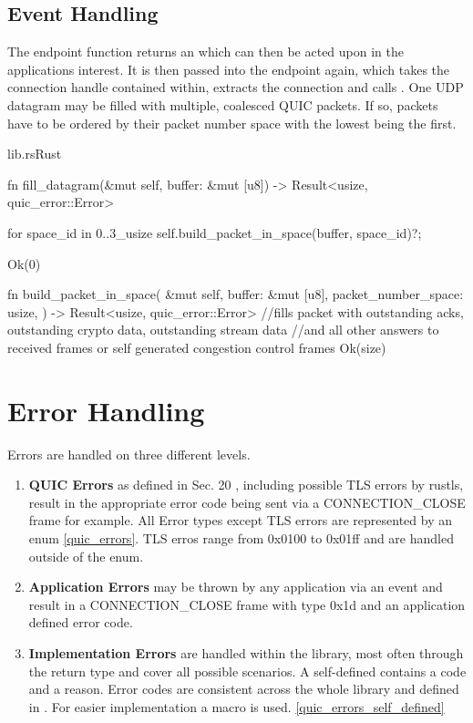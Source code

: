 \subsection{Event Handling}

The endpoint function  returns an  which can then be acted upon in the applications interest.
It is then passed into the endpoint again, which takes the connection handle contained within, extracts the connection and calls
. One UDP datagram may be filled with multiple, coalesced QUIC packets. If so, packets have to be ordered
by their packet number space with the lowest being the first. 

\begin{codeblock}{lib.rs}{Rust}
    \begin{rustcode}
        fn fill_datagram(&mut self, buffer: &mut [u8]) -> Result<usize, quic_error::Error> {

            for space_id in 0..3_usize {
                self.build_packet_in_space(buffer, space_id)?;
            }

            Ok(0)
        }

        fn build_packet_in_space(
            &mut self,
            buffer: &mut [u8],
            packet_number_space: usize,
        ) -> Result<usize, quic_error::Error> {
            //fills packet with outstanding acks, outstanding crypto data, outstanding stream data
            //and all other answers to received frames or self generated congestion control frames
            Ok(size)
        }
    \end{rustcode}
    \label{packet_building}
\end{codeblock}

\section{Error Handling}

Errors are handled on three different levels.
\begingroup
\renewcommand\labelenumi{(\theenumi)}
\begin{enumerate}
\item \textbf{QUIC Errors} as defined in Sec. 20 \cite{rfc9000}, including possible TLS errors by rustls, result in the appropriate
error code being sent via a CONNECTION\_CLOSE frame for example. All Error types except TLS errors are represented by an enum 
\ref{quic_errors}. TLS erros range from 0x0100 to 0x01ff and are handled outside of the enum.
\item \textbf{Application Errors} may be thrown by any application via an event and result in a CONNECTION\_CLOSE frame with type 0x1d
and an application defined error code.
\item \textbf{Implementation Errors} are handled within the library, most often through the  return
type and cover all possible scenarios. A self-defined  contains a code and a reason. Error codes are consistent across
the whole library and defined in . For easier implementation a macro is used. \ref{quic_errors_self_defined}
\end{enumerate}
\endgroup

